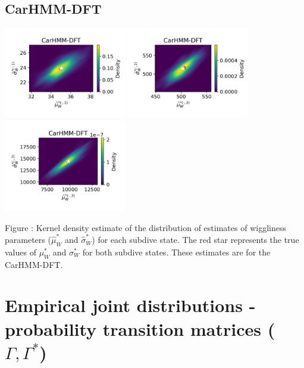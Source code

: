\documentclass{article}
\begin{document}
        \subsection{CarHMM-DFT}
        \begin{center}
        \includegraphics[width=2.1in]{../Plots/hmm_FV_MLE_density_FoVeDBA_0_0.png}
        \includegraphics[width=2.1in]{../Plots/hmm_FV_MLE_density_FoVeDBA_0_1.png}
        \includegraphics[width=2.1in]{../Plots/hmm_FV_MLE_density_FoVeDBA_0_2.png}
        \end{center}
        
        \noindent Figure : Kernel density estimate of the distribution of estimates of wiggliness parameters ($\hat \mu^*_W$ and $\hat \sigma^*_W$) for each subdive state. The red star represents the true values of $\mu^*_W$ and $\sigma^*_W$ for both subdive states. These estimates are for the CarHMM-DFT.
        \addtocounter{fignum}{1}
        
    \newpage
    \section{Empirical joint distributions - probability transition matrices ($\Gamma, \Gamma^*$)}
        
\end{document}
